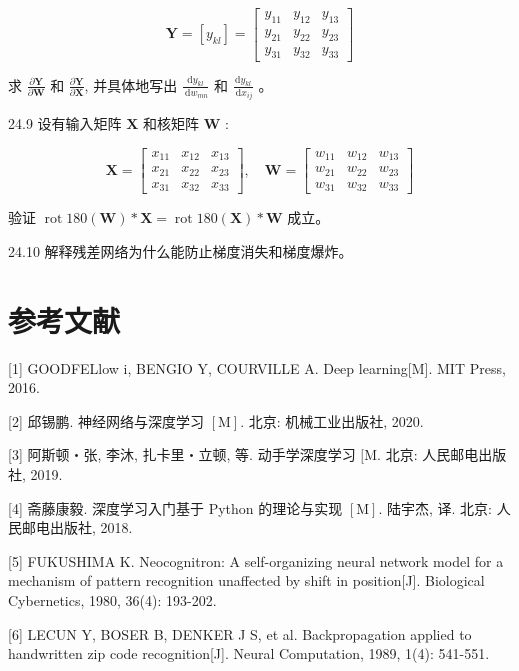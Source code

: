 \documentclass[10pt]{article}
\begin{document}
$$
\boldsymbol{Y}=\left[y_{k l}\right]=\left[\begin{array}{lll}
y_{11} & y_{12} & y_{13} \\
y_{21} & y_{22} & y_{23} \\
y_{31} & y_{32} & y_{33}
\end{array}\right]
$$

求 $\frac{\partial \boldsymbol{Y}}{\partial \boldsymbol{W}}$ 和 $\frac{\partial \boldsymbol{Y}}{\partial \boldsymbol{X}}$, 并具体地写出 $\frac{\mathrm{d} y_{k l}}{\mathrm{~d} w_{m n}}$ 和 $\frac{\mathrm{d} y_{k l}}{\mathrm{~d} x_{i j}}$ 。

24.9 设有输入矩阵 $\boldsymbol{X}$ 和核矩阵 $\boldsymbol{W}$ :

$$
\boldsymbol{X}=\left[\begin{array}{lll}
x_{11} & x_{12} & x_{13} \\
x_{21} & x_{22} & x_{23} \\
x_{31} & x_{32} & x_{33}
\end{array}\right], \quad \boldsymbol{W}=\left[\begin{array}{lll}
w_{11} & w_{12} & w_{13} \\
w_{21} & w_{22} & w_{23} \\
w_{31} & w_{32} & w_{33}
\end{array}\right]
$$

验证 $\operatorname{rot} 180(\boldsymbol{W}) * \boldsymbol{X}=\operatorname{rot} 180(\boldsymbol{X}) * \boldsymbol{W}$ 成立。

24.10 解释残差网络为什么能防止梯度消失和梯度爆炸。

\section*{参考文献}
[1] GOODFELlow i, BENGIO Y, COURVILLE A. Deep learning[M]. MIT Press, 2016.

[2] 邱锡鹏. 神经网络与深度学习 $[\mathrm{M}]$. 北京: 机械工业出版社, 2020.

[3] 阿斯顿・张, 李沐, 扎卡里・立顿, 等. 动手学深度学习 $[\mathrm{M}$. 北京: 人民邮电出版社, 2019.

[4] 斋藤康毅. 深度学习入门基于 Python 的理论与实现 $[\mathrm{M}]$. 陆宇杰, 译. 北京: 人民邮电出版社, 2018.

[5] FUKUSHIMA K. Neocognitron: A self-organizing neural network model for a mechanism of pattern recognition unaffected by shift in position[J]. Biological Cybernetics, 1980, 36(4): 193-202.

[6] LECUN Y, BOSER B, DENKER J S, et al. Backpropagation applied to handwritten zip code recognition[J]. Neural Computation, 1989, 1(4): 541-551.
\end{document}
